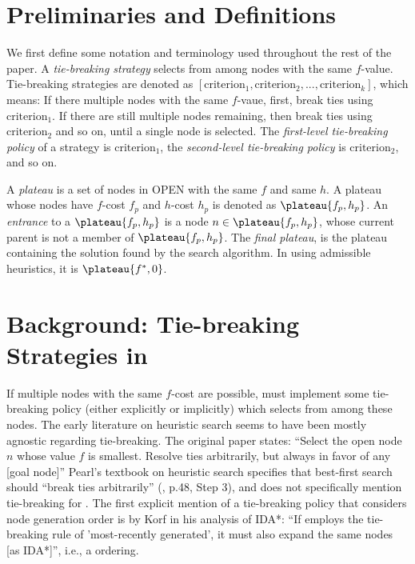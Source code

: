 \section{Preliminaries and Definitions}

We first define some notation and terminology used throughout the rest of the paper.
A \emph{tie-breaking strategy} selects from among nodes with the same $f$-value.
Tie-breaking strategies are denoted as $[\text{criterion}_1, \text{criterion}_2, ..., \text{criterion}_k]$,
which means: If there multiple nodes with the same $f$-vaue, first, break ties using $\text{criterion}_1$. 
If there are still multiple nodes remaining, then break ties using $\text{criterion}_2$ and so on, until a single node is selected.
The \emph{first-level tie-breaking policy} of a strategy is
$\text{criterion}_1$, the \emph{second-level tie-breaking policy} is
$\text{criterion}_2$, and so on.

A \emph{plateau} is a set of nodes in OPEN with the same $f$ and same $h$.
A plateau whose nodes have $f$-cost $f_p$ and $h$-cost $h_p$ is denoted as
$\plateau{f_p,h_p}$.
An  \emph{entrance} to a $\plateau{f_p,h_p}$ is a node $n \in \plateau{f_p,h_p}$, whose current parent is not a member of $\plateau{f_p,h_p}$.
The \emph{final plateau},  is the plateau containing the solution found by the search algorithm.
In \astar using admissible heuristics, it is $\plateau{f^*,0}$.

\section{Background: Tie-breaking Strategies in \astar}


If multiple nodes with the same $f$-cost are possible, \astar
must implement some tie-breaking policy (either
explicitly or implicitly) which selects from among these nodes.
The early literature on heuristic search seems to have been mostly agnostic regarding tie-breaking.
The original \astar paper 
states: ``Select the open node $n$ whose value $f$
is smallest. Resolve ties arbitrarily, but always in favor of any [goal
node]'' \cite[p.102 Step 2]{hart1968formal} %
Pearl's textbook on heuristic search specifies that best-first search should ``break ties arbitrarily'' (\citeyear{pearl1984heuristics}, p.48, Step 3), and does not specifically mention tie-breaking for \astar.
The first explicit mention of a tie-breaking policy that considers node generation order is by Korf in his analysis of IDA*: ``If \astar employs the tie-breaking rule of 'most-recently generated', it must also expand the same nodes [as IDA*]'', i.e., a \lifo ordering.


